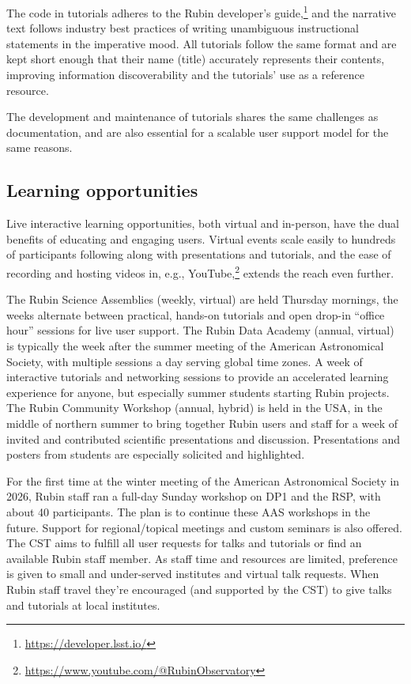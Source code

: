 The code in tutorials adheres to the Rubin developer's guide,\footnote{\url{https://developer.lsst.io/}} and the narrative text follows industry best practices of writing unambiguous instructional statements in the imperative mood.
All tutorials follow the same format and are kept short enough that their name (title) accurately represents their contents, improving information discoverability and the tutorials' use as a reference resource.

The development and maintenance of tutorials shares the same challenges as documentation, and are also essential for a scalable user support model for the same reasons.


\subsection{Learning opportunities}

Live interactive learning opportunities, both virtual and in-person, have the dual benefits of educating and engaging users.
Virtual events scale easily to hundreds of participants following along with presentations and tutorials, and the ease of recording and hosting videos in, e.g., YouTube,\footnote{\url{https://www.youtube.com/@RubinObservatory}} extends the reach even further.

The Rubin Science Assemblies (weekly, virtual) are held Thursday mornings, the weeks alternate between practical, hands-on tutorials and open drop-in ``office hour'' sessions for live user support.
The Rubin Data Academy (annual, virtual) is typically the week after the summer meeting of the American Astronomical Society, with multiple sessions a day serving global time zones.
A week of interactive tutorials and networking sessions to provide an accelerated learning experience for anyone, but especially summer students starting Rubin projects. 
The Rubin Community Workshop (annual, hybrid) is held in the USA, in the middle of northern summer to bring together Rubin users and staff for a week of invited and contributed scientific presentations and discussion.
Presentations and posters from students are especially solicited and highlighted.

For the first time at the winter meeting of the American Astronomical Society in 2026, Rubin staff ran a full-day Sunday workshop on DP1 and the RSP, with about 40 participants.
The plan is to continue these AAS workshops in the future.
Support for regional/topical meetings and custom seminars is also offered.
The CST aims to fulfill all user requests for talks and tutorials or find an available Rubin staff member.
As staff time and resources are limited, preference is given to small and under-served institutes and virtual talk requests.
When Rubin staff travel they're encouraged (and supported by the CST) to give talks and tutorials at local institutes.

